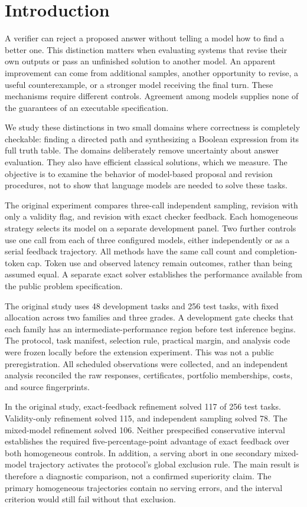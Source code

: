 \section{Introduction}

A verifier can reject a proposed answer without telling a model how to find a better one. This distinction matters when evaluating systems that revise their own outputs or pass an unfinished solution to another model. An apparent improvement can come from additional samples, another opportunity to revise, a useful counterexample, or a stronger model receiving the final turn. These mechanisms require different controls. Agreement among models supplies none of the guarantees of an executable specification.

We study these distinctions in two small domains where correctness is completely checkable: finding a directed path and synthesizing a Boolean expression from its full truth table. The domains deliberately remove uncertainty about answer evaluation. They also have efficient classical solutions, which we measure. The objective is to examine the behavior of model-based proposal and revision procedures, not to show that language models are needed to solve these tasks.

The original experiment compares three-call independent sampling, revision with only a validity flag, and revision with exact checker feedback. Each homogeneous strategy selects its model on a separate development panel. Two further controls use one call from each of three configured models, either independently or as a serial feedback trajectory. All methods have the same call count and completion-token cap. Token use and observed latency remain outcomes, rather than being assumed equal. A separate exact solver establishes the performance available from the public problem specification.

The original study uses 48 development tasks and 256 test tasks, with fixed allocation across two families and three grades. A development gate checks that each family has an intermediate-performance region before test inference begins. The protocol, task manifest, selection rule, practical margin, and analysis code were frozen locally before the extension experiment. This was not a public preregistration. All scheduled observations were collected, and an independent analysis reconciled the raw responses, certificates, portfolio memberships, costs, and source fingerprints.

In the original study, exact-feedback refinement solved 117 of 256 test tasks. Validity-only refinement solved 115, and independent sampling solved 78. The mixed-model refinement solved 106. Neither prespecified conservative interval establishes the required five-percentage-point advantage of exact feedback over both homogeneous controls. In addition, a serving abort in one secondary mixed-model trajectory activates the protocol's global exclusion rule. The main result is therefore a diagnostic comparison, not a confirmed superiority claim. The primary homogeneous trajectories contain no serving errors, and the interval criterion would still fail without that exclusion.

